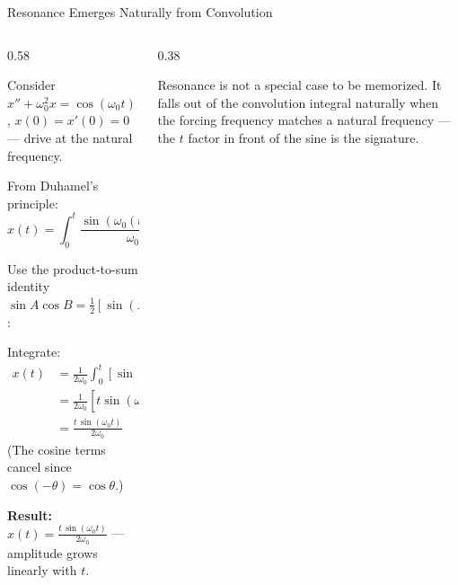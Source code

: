 \documentclass[aspectratio=169,11pt]{beamer}
\newcommand{\resizeeq}[1]{\resizebox{\textwidth}{!}{$#1$}}
\begin{document}
\begin{frame}{Resonance Emerges Naturally from Convolution}
\footnotesize
\begin{columns}[T]
\begin{column}{0.58\textwidth}
\begin{examplebox}
Consider $x'' + \omega_0^2 x = \cos(\omega_0 t)$, $x(0) = x'(0) = 0$ --- drive at the natural frequency.

From Duhamel's principle:
\[x(t) = \int_0^t \frac{\sin(\omega_0(t-\tau))}{\omega_0}\, \cos(\omega_0 \tau)\, d\tau\]

Use the product-to-sum identity $\sin A \cos B = \tfrac{1}{2}[\sin(A+B) + \sin(A-B)]$:
\resizeeq{\sin(\omega_0(t-\tau))\cos(\omega_0\tau) = \tfrac{1}{2}[\sin(\omega_0 t) + \sin(\omega_0(t-2\tau))]}

Integrate:
\begin{align*}
x(t) &= \frac{1}{2\omega_0}\int_0^t [\sin(\omega_0 t) + \sin(\omega_0(t-2\tau))]\, d\tau \\
&= \frac{1}{2\omega_0}\!\left[t\sin(\omega_0 t) + \frac{\cos(\omega_0(t-2\tau))}{2\omega_0}\Big|_0^t\right] \\
&= \frac{t\,\sin(\omega_0 t)}{2\omega_0}
\end{align*}
(The cosine terms cancel since $\cos(-\theta) = \cos\theta$.)

\textbf{Result:} $x(t) = \frac{t\,\sin(\omega_0 t)}{2\omega_0}$ --- amplitude grows linearly with $t$.
\end{examplebox}
\end{column}
\begin{column}{0.38\textwidth}
\centering
{}
\vspace{1mm}
\begin{conceptbox}
Resonance is not a special case to be memorized. It falls out of the convolution integral naturally when the forcing frequency matches a natural frequency --- the $t$ factor in front of the sine is the signature.
\end{conceptbox}
\end{column}
\end{columns}
\end{frame}
\end{document}
